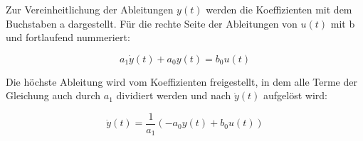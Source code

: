 \documentclass[
  ngerman
  ,12pt
  ,pdftex
]{article}
\begin{document}
Zur Vereinheitlichung der Ableitungen $y(t)$ werden die Koeffizienten mit dem Buchstaben a dargestellt.
Für die rechte Seite der Ableitungen von $u(t)$ mit b und fortlaufend nummeriert:

\begin{equation*}
  a_1\dot y(t)+a_0y(t) = b_0u(t)
\end{equation*}

Die höchste Ableitung wird vom Koeffizienten freigestellt, in dem alle Terme der Gleichung auch durch $a_1$ dividiert werden und nach $\dot y(t)$ aufgelöst wird:

\begin{equation*}
  \dot y(t)= \frac{1}{a_1}(-a_0y(t) +b_0u(t))
\end{equation*}










\end{document}
